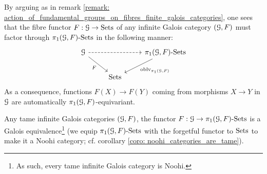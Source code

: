             \begin{remark} \label{remark: action_of_fundamental_groups_on_fibres_infinite_galois_categories}
                By arguing as in remark \ref{remark: action_of_fundamental_groups_on_fibres_finite_galois_categories}, one sees that the fibre functor $F: \mathcal{G} \to \mathrm{Sets}$ of any infinite Galois category $(\mathcal{G}, F)$ must factor through $\pi_1(\mathcal{G}, F)\text{-}\mathrm{Sets}$ in the following manner:
                    $$
                        \begin{tikzcd}
                        	\calG && {\pi_1(\calG, F)\-\Sets} \\
                        	& \Sets
                        	\arrow[dashed, from=1-1, to=1-3]
                        	\arrow["F"', from=1-1, to=2-2]
                        	\arrow["{\oblv_{\pi_1(\calG, F)}}", from=1-3, to=2-2]
                        \end{tikzcd}
                    $$
                As a consequence, functions $F(X) \to F(Y)$ coming from morphisms $X \to Y$ in $\mathcal{G}$ are automatically $\pi_1(\mathcal{G}, F)$-equivariant. 
            \end{remark}
            \begin{theorem} \label{theorem: infinite_categorical_galois_correspondence}
                \cite[Theorem 7.2.5(3)]{bhatt_scholze_2014_pro_etale} Any tame infinite Galois categories $(\mathcal{G}, F)$, the functor $F: \mathcal{G} \to \pi_1(\mathcal{G}, F)\text{-}\mathrm{Sets}$ is a Galois equivalence\footnote{As such, every tame infinite Galois category is Noohi.} (we equip $\pi_1(\mathcal{G}, F)\text{-}\mathrm{Sets}$ with the forgetful functor to $\mathrm{Sets}$ to make it a Noohi category; cf. corollary \ref{coro: noohi_categories_are_tame}).
            \end{theorem}

